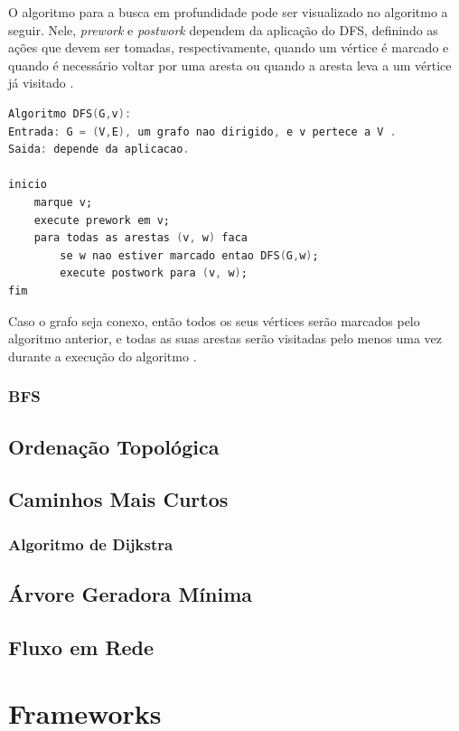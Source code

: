 O algoritmo para a busca em profundidade pode ser visualizado no algoritmo a seguir. Nele, \textit{prework} e \textit{postwork} dependem da aplicação do DFS, definindo as ações que devem ser tomadas, respectivamente, quando um vértice é marcado e quando é necessário voltar por uma aresta ou quando a aresta leva a um vértice já visitado \cite{Manber:1989}.

\begin{lstlisting}[language=Ada]
Algoritmo DFS(G,v):
Entrada: G = (V,E), um grafo nao dirigido, e v pertece a V .
Saida: depende da aplicacao.

inicio
	marque v;
	execute prework em v;
	para todas as arestas (v, w) faca
		se w nao estiver marcado entao DFS(G,w);
		execute postwork para (v, w);
fim
\end{lstlisting}

Caso o grafo seja conexo, então todos os seus vértices serão marcados pelo algoritmo anterior, e todas as suas
arestas serão visitadas pelo menos uma vez durante a execução do algoritmo \cite{Manber:1989}.
\subsubsection{BFS}

\subsection{Ordenação Topológica}

\subsection{Caminhos Mais Curtos}

\subsubsection{Algoritmo de Dijkstra}

\subsection{Árvore Geradora Mínima}

\subsection{Fluxo em Rede}

\section{Frameworks}


